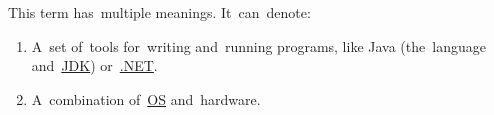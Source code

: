 \label{platform}
This term has~multiple meanings.
It~can~denote:
\begin{enumerate}[label=\arabic*)]
    \item A~set of~tools for~writing and~running programs, like Java (the~language and~\hyperref[jdkjrejvm]{JDK}) or~\hyperref[dotnet]{.NET}.
    \item A~combination of~\hyperref[os]{OS} and~hardware.
\end{enumerate}
